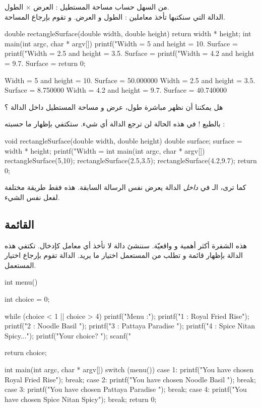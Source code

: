 من السهل حساب مساحة المستطيل : العرض $\times$ الطول.\\
الدالة التي سنكتبها
تأخذ معاملين : الطول و العرض. و تقوم بإرجاع المساحة.

\begin{Csource}
double rectangleSurface(double width, double height)
{
	return width * height;
}
int main(int argc, char * argv[])
{
	printf("Width = 5 and height = 10. Surface = %
	printf("Width = 2.5 and height = 3.5. Surface = %
	printf("Width = 4.2 and height = 9.7. Surface = %
	return 0;
}
\end{Csource}

\begin{Console}
Width = 5 and height = 10. Surface = 50.000000
Width = 2.5 and height = 3.5. Surface = 8.750000
Width = 4.2 and height = 9.7. Surface = 40.740000
\end{Console}

\begin{question}
هل يمكننا أن نظهر مباشرة طول، عرض و مساحة المستطيل داخل الدالة ؟
\end{question}

بالطبع ! في هذه الحالة لن ترجع الدالة أي شيء. ستكتفي بإظهار ما حسبته :

\begin{Csource}
void rectangleSurface(double width, double height)
{
	double surface;
	surface = width * height;
	printf("Width = %
}
int main(int argc, char * argv[])
{
	rectangleSurface(5,10);
	rectangleSurface(2.5,3.5);
	rectangleSurface(4.2,9.7);
	return 0;
}
\end{Csource}

كما ترى، الـ
في
\textit{داخل}
الدالة
يعرض نفس الرسالة السابقة. هذه فقط طريقة مختلفة لفعل نفس الشيء.

\subsection{القائمة}

هذه الشفرة أكثر أهمية و واقعيّة. سننشئ دالة 
لا تأخذ أي معامل كإدخال. تكتفي هذه الدالة بإظهار قائمة و تطلب من المستعمل اختيار ما يريد. الدالة تقوم بإرجاع اختيار المستعمل.

\begin{Csource}
int menu()
{
	int choice = 0;
	
	while (choice < 1 || choice > 4)
	{
		printf("Menu :\n");
		printf("1 : Royal Fried Rise\n");
		printf("2 : Noodle Basil \n");
		printf("3 : Pattaya Paradise \n");
		printf("4 : Spice Nitan Spicy...\n");
		printf("Your choice? ");
		scanf("%
	}   
	
	return choice;
}
int main(int argc, char * argv[])
{   
	switch (menu())
	{
		case 1:
		printf("You have chosen Royal Fried Rise\n");
		break;
		case 2:
		printf("You have chosen Noodle Basil \n");
		break;
		case 3:
		printf("You have chosen Pattaya Paradise \n");
		break;
		case 4:
		printf("You have chosen Spice Nitan Spicy\n");
		break;   
	}
	return 0;
}
\end{Csource}

